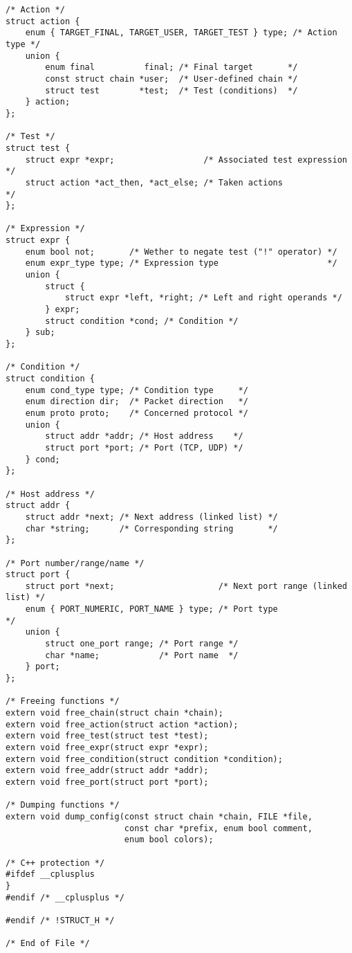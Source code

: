 \documentclass[a4paper,landscape,twocolumn,11pt]{article}
\begin{document}
\begin{lstlisting}
/* Action */
struct action {
    enum { TARGET_FINAL, TARGET_USER, TARGET_TEST } type; /* Action type */
    union {
        enum final          final; /* Final target       */
        const struct chain *user;  /* User-defined chain */
        struct test        *test;  /* Test (conditions)  */
    } action;
};

/* Test */
struct test {
    struct expr *expr;                  /* Associated test expression */
    struct action *act_then, *act_else; /* Taken actions              */
};

/* Expression */
struct expr {
    enum bool not;       /* Wether to negate test ("!" operator) */
    enum expr_type type; /* Expression type                      */
    union {
        struct {
            struct expr *left, *right; /* Left and right operands */
        } expr;
        struct condition *cond; /* Condition */
    } sub;
};

/* Condition */
struct condition {
    enum cond_type type; /* Condition type     */
    enum direction dir;  /* Packet direction   */
    enum proto proto;    /* Concerned protocol */
    union {
        struct addr *addr; /* Host address    */
        struct port *port; /* Port (TCP, UDP) */
    } cond;
};

/* Host address */
struct addr {
    struct addr *next; /* Next address (linked list) */
    char *string;      /* Corresponding string       */
};

/* Port number/range/name */
struct port {
    struct port *next;                     /* Next port range (linked list) */
    enum { PORT_NUMERIC, PORT_NAME } type; /* Port type                     */
    union {
        struct one_port range; /* Port range */
        char *name;            /* Port name  */
    } port;
};

/* Freeing functions */
extern void free_chain(struct chain *chain);
extern void free_action(struct action *action);
extern void free_test(struct test *test);
extern void free_expr(struct expr *expr);
extern void free_condition(struct condition *condition);
extern void free_addr(struct addr *addr);
extern void free_port(struct port *port);

/* Dumping functions */
extern void dump_config(const struct chain *chain, FILE *file,
                        const char *prefix, enum bool comment,
                        enum bool colors);

/* C++ protection */
#ifdef __cplusplus
}
#endif /* __cplusplus */

#endif /* !STRUCT_H */

/* End of File */
\end{lstlisting}
\end{document}
